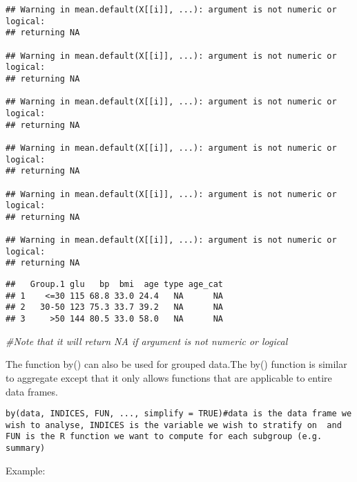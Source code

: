 \documentclass[]{book}
\newenvironment{Shaded}{\begin{snugshade}}{\end{snugshade}}
\newcommand{\KeywordTok}[1]{\textcolor[rgb]{0.13,0.29,0.53}{\textbf{#1}}}
\newcommand{\CommentTok}[1]{\textcolor[rgb]{0.56,0.35,0.01}{\textit{#1}}}
\newcommand{\OperatorTok}[1]{\textcolor[rgb]{0.81,0.36,0.00}{\textbf{#1}}}
\newcommand{\NormalTok}[1]{#1}
\theoremstyle{definition}
\theoremstyle{definition}
\theoremstyle{definition}
\theoremstyle{remark}
\begin{document}
\begin{verbatim}
## Warning in mean.default(X[[i]], ...): argument is not numeric or logical:
## returning NA

## Warning in mean.default(X[[i]], ...): argument is not numeric or logical:
## returning NA

## Warning in mean.default(X[[i]], ...): argument is not numeric or logical:
## returning NA

## Warning in mean.default(X[[i]], ...): argument is not numeric or logical:
## returning NA

## Warning in mean.default(X[[i]], ...): argument is not numeric or logical:
## returning NA

## Warning in mean.default(X[[i]], ...): argument is not numeric or logical:
## returning NA
\end{verbatim}

\begin{verbatim}
##   Group.1 glu   bp  bmi  age type age_cat
## 1    <=30 115 68.8 33.0 24.4   NA      NA
## 2   30-50 123 75.3 33.7 39.2   NA      NA
## 3     >50 144 80.5 33.0 58.0   NA      NA
\end{verbatim}

\begin{Shaded}
\begin{Highlighting}[]
\CommentTok{#Note that it will return NA if argument is not numeric or logical}
\end{Highlighting}
\end{Shaded}

The function by() can also be used for grouped data.The by() function is
similar to aggregate except that it only allows functions that are
applicable to entire data frames.

\begin{verbatim}
by(data, INDICES, FUN, ..., simplify = TRUE)#data is the data frame we wish to analyse, INDICES is the variable we wish to stratify on  and FUN is the R function we want to compute for each subgroup (e.g. summary)
\end{verbatim}

Example:

\begin{Shaded}
\end{Shaded}
\end{document}
